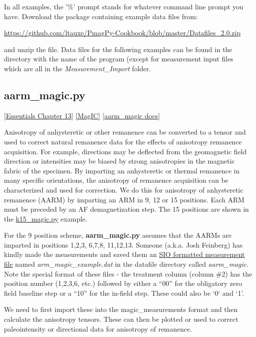\documentclass[11pt]{book}
\begin{document}
{{In all examples, the '\%' prompt stands for whatever command line prompt you have. 
Download the package containing example data files  from: 

 \url{https://github.com/ltauxe/PmagPy-Cookbook/blob/master/Datafiles_2.0.zip} 
 
\noindent  and unzip the file.   Data files for the following examples can be found in the directory with the name of the program (except for measurement input files which are all in the {\it Measurement\_Import} folder.  


\subsection{aarm\_magic.py}
 \href{http://magician.ucsd.edu/Essentials_2/WebBook2ch13.html#ch13}{[Essentials Chapter 13]} 
\href{#MagIC}{[MagIC]}
\href{http://earthref.org/PmagPy/pmagpydocs/aarm_magic-module.html}{[aarm\_magic docs]}

Anisotropy of anhysteretic or other remanence can be converted to a tensor and used to correct natural remanence data for the effects of anisotropy remanence acquisition.  For example, directions may be deflected from the geomagnetic field direction or intensities may be biased by strong anisotropies in the magnetic fabric of the specimen.  By imparting an anhysteretic or thermal remanence in many specific orientations, the anisotropy of remanence acquisition can be characterized and used for correction.   We do this for anisotropy of anhysteretic remanence (AARM) by imparting an ARM in 9, 12  or 15 positions.  Each ARM must be preceded by an AF demagnetization step.    The 15 positions are shown in the \href{#k15_magic.py}{k15\_magic.py} example. 




 For the 9 position scheme,  {\bf aarm\_magic.py} assumes that the AARMs are imparted in positions 1,2,3, 6,7,8, 11,12,13.    Someone (a.k.a. Josh Feinberg) has kindly made the measurements and saved them an \href{#sio_magic.py}{SIO formatted measurement file} named {\it arm\_magic\_example.dat} in the datafile directory called {\it aarm\_magic}.   Note the special format of these files - the treatment column (column \#2) has the position number (1,2,3,6, etc.) followed by either a ``00'' for the obligatory zero field baseline step or a ``10'' for the in-field step.  These could also be `0` and `1'.    
 
 We need to first import these into the magic\_measurements format and then calculate the anisotropy tensors.  These can then be plotted or used to correct paleointensity or directional data for anisotropy of remanence.  
 
}}
\end{document}
